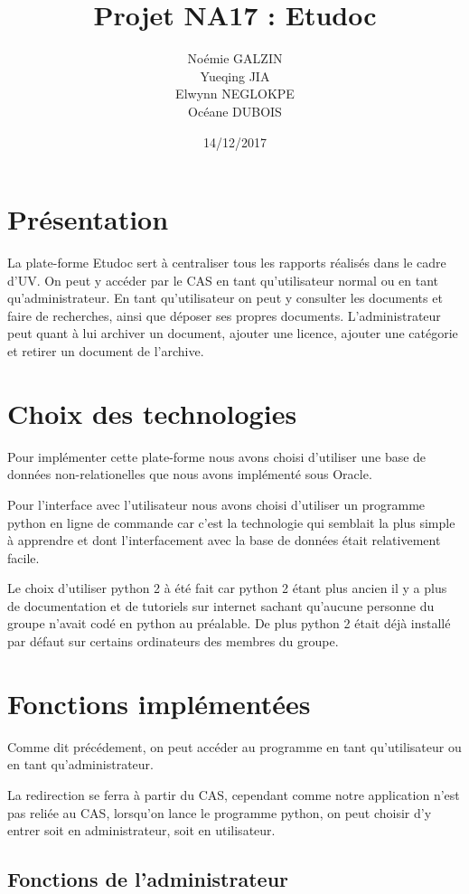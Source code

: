 \documentclass[11pt]{report}
\title{\textbf{Projet NA17 : Etudoc}}
\author{Noémie GALZIN \\
		Yueqing JIA \\
		Elwynn NEGLOKPE\\
		Océane DUBOIS}
\date{14/12/2017}
\begin{document}
\maketitle
\newpage
\section{Présentation}
La plate-forme Etudoc sert à centraliser tous les rapports réalisés dans le cadre d'UV. On peut y accéder par le CAS en tant qu'utilisateur normal ou en tant qu'administrateur. 
En tant qu'utilisateur on peut y consulter les documents et faire de recherches, ainsi que déposer ses propres documents. 
L'administrateur peut quant à lui archiver un document, ajouter une licence, ajouter une catégorie et retirer un document de l'archive.

\section{Choix des technologies}
Pour implémenter cette plate-forme nous avons choisi d'utiliser une base de données non-relationelles que nous avons implémenté sous Oracle. 

Pour l'interface avec l'utilisateur nous avons choisi d'utiliser un programme python en ligne de commande car c'est la technologie qui semblait la plus simple à apprendre et dont l'interfacement avec la base de données était relativement facile.

Le choix d'utiliser python 2 à été fait car python 2 étant plus ancien il y a plus de documentation et de tutoriels sur internet sachant qu'aucune personne du groupe n'avait codé en python au préalable. De plus python 2 était déjà installé par défaut sur certains ordinateurs des membres du groupe.

\section{Fonctions implémentées}

Comme dit précédement, on peut accéder au programme en tant qu'utilisateur ou en tant qu'administrateur.

La redirection se ferra à partir du CAS, cependant comme notre application n'est pas reliée au CAS, lorsqu'on lance le programme python, on peut choisir d'y entrer soit en administrateur, soit en utilisateur.

\subsection{Fonctions de l'administrateur}
\end{document}
